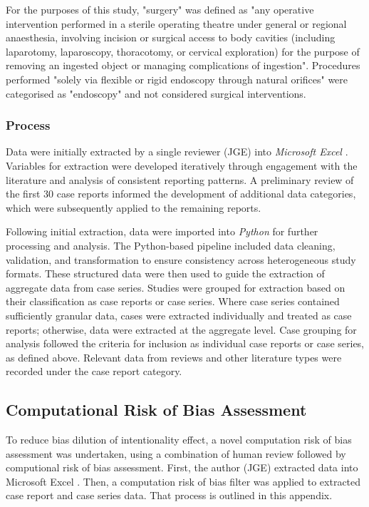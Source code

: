 \begin{appendices}
For the purposes of this study, "surgery" was defined as "any operative intervention performed in a sterile operating theatre under general or regional anaesthesia, involving incision or surgical access to body cavities (including laparotomy, laparoscopy, thoracotomy, or cervical exploration) for the purpose of removing an ingested object or managing complications of ingestion". Procedures performed "solely via flexible or rigid endoscopy through natural orifices" were categorised as "endoscopy" and not considered surgical interventions.

\subsubsection{Process}

Data were initially extracted by a single reviewer (JGE) into \textit{Microsoft Excel} \cite{MicrosoftCorporation_2025}. Variables for extraction were developed iteratively through engagement with the literature and analysis of consistent reporting patterns. A preliminary review of the first 30 case reports informed the development of additional data categories, which were subsequently applied to the remaining reports. 

Following initial extraction, data were imported into \textit{Python} \cite{PythonSoftwareFoundation_2025} for further processing and analysis. The Python-based pipeline included data cleaning, validation, and transformation to ensure consistency across heterogeneous study formats. These structured data were then used to guide the extraction of aggregate data from case series. Studies were grouped for extraction based on their classification as case reports or case series. Where case series contained sufficiently granular data, cases were extracted individually and treated as case reports; otherwise, data were extracted at the aggregate level. Case grouping for analysis followed the criteria for inclusion as individual case reports or case series, as defined above. Relevant data from reviews and other literature types were recorded under the case report category.

\subsection{Computational Risk of Bias Assessment}
\label{appendix:bias}

To reduce bias dilution of intentionality effect, a novel computation risk of bias assessment was undertaken, using a combination of human review followed by computional risk of bias assessment. First, the author (JGE) extracted data into Microsoft Excel \cite{MicrosoftCorporation_2025}. Then, a computation risk of bias filter was applied to extracted case report and case series data. That process is outlined in this appendix.


\end{appendices}
